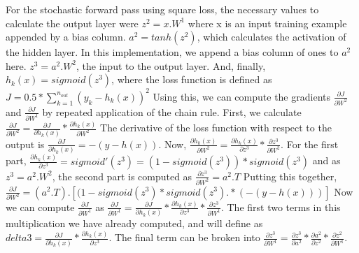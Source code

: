 \documentclass[11pt]{article}
\begin{document}
For the stochastic forward pass using square loss, the necessary values to calculate the output layer were
\newline
$ z^{2} = x.W^{1} $ where x is an input training example appended by a bias column.
\newline
$ a^{2} =  tanh(z^{2}) $, which calculates the activation of the hidden layer. In this implementation, we append a bias column of ones to $a^{2}$ here.
\newline
$ z^{3} = a^{2}.W^{2}$, the input to the output layer.
\newline
And, finally, $h_{k}(x) = sigmoid(z^{3}) $, where the loss function is defined as $ J = 0.5 * \sum_{k=1}^{n_{out}} (y_{k} - h_{k}(x))^{2}$
\newline
Using this, we can compute the gradients $\frac{\partial J}{\partial W^{2}}$ and $\frac{\partial J}{\partial W^{1}}$ by repeated application of the chain rule.
\newline
First, we calculate $\frac{\partial J}{\partial W^{2}} = \frac{\partial J}{\partial h_{k}(x)} * \frac{\partial h_{k}(x)}{\partial W^{2}}$
\newline
The derivative of the loss function with respect to the output is $\frac{\partial J}{\partial h_{k}(x)} = -(y - h(x))$.
\newline
Now, $\frac{\partial h_{k}(x)}{\partial W^{2}} = \frac{\partial h_{k}(x)}{\partial z^{3}} * \frac{\partial z^{3}}{\partial W^{2}}$.
\newline
For the first part, $\frac{\partial h_{k}(x)}{\partial z^{3}} = sigmoid'(z^{3}) = (1 - sigmoid(z^{3}))*sigmoid(z^{3})$ and as $ z^{3} = a^{2}.W^{2}$, the second part is computed as $\frac{\partial z^{3}}{\partial W^{2}} = a^{2}.T$
\newline
Putting this together, $\frac{\partial J}{\partial W^{2}} = (a^{2}.T) . [(1 - sigmoid(z^{3})*sigmoid(z^{3}) .* (-(y - h(x)))]$
\newline
Now we can compute $\frac{\partial J}{\partial W^{1}}$ as $\frac{\partial J}{\partial W^{1}} = \frac{\partial J}{\partial h_{k}(x)} * \frac{\partial h_{k}(x)}{\partial z^{3}} * \frac{\partial z^{3}}{\partial W^{1}}$.
\newline
The first two terms in this multiplication we have already computed, and will define as $ delta3 = \frac{\partial J}{\partial h_{k}(x)} * \frac{\partial h_{k}(x)}{\partial z^{3}}$. 
\newline
The final term can be broken into $\frac{\partial z^{3}}{\partial W^{1}} = \frac{\partial z^{3}}{\partial a^{2}} * \frac{\partial a^{2}}{\partial z^{2}} * \frac{\partial z^{2}}{\partial W^{1}}$.
\end{document}
